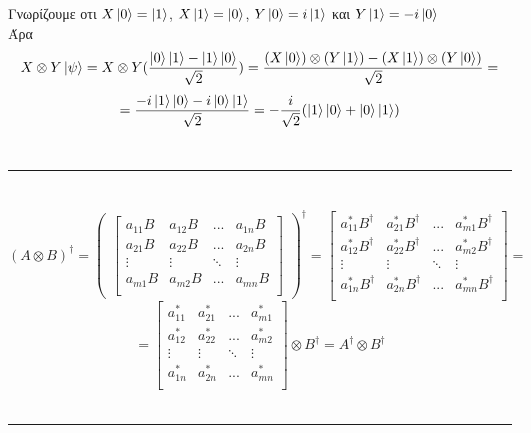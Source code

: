 \documentclass[12pt]{article}
\begin{document}
\section*{{}}
    Γνωρίζουμε οτι $X\ket{0}= \ket{1}$, $X\ket{1}= \ket{0}$, $Y\ket{0}= i\ket{1}$ και $Y\ket{1}= -i\ket{0}$\\
Άρα 
$$ X \otimes Y\ket{\psi} = X \otimes Y(\frac{\ket{0}\ket{1} - \ket{1}\ket{0}}{\sqrt{2}}) = \frac{(X\ket{0})\otimes(Y\ket{1}) - (X\ket{1})\otimes(Y\ket{0})}{\sqrt{2}}=$$ 
$$ = \frac{-i\ket{1}\ket{0} - i\ket{0}\ket{1}}{\sqrt{2}}=-\frac{i}{\sqrt{2}}(\ket{1}\ket{0} +\ket{0}\ket{1})$$\\
\rule{\textwidth}{.5pt}
\section*{{}}
$$(A\otimes B)^\dag = \begin{pmatrix}\begin{bmatrix}
    a_{11}B & a_{12}B & ... & a_{1n}B \\
    a_{21}B & a_{22}B & ... & a_{2n}B \\
    \vdots &\vdots & \ddots& \vdots \\
    a_{m1}B & a_{m2}B & ... & a_{mn}B \\
\end{bmatrix}\end{pmatrix} ^\dag = \begin{bmatrix}
    a_{11}^*B^\dag &  a_{21}^*B^\dag & ... &  a_{m1}^*B^\dag \\
    a_{12}^*B^\dag & a_{22}^*B^\dag & ... &  a_{m2}^*B^\dag \\
    \vdots &\vdots & \ddots& \vdots \\
    a_{1n}^*B^\dag &  a_{2n}^*B^\dag & ... &  a_{mn}^*B^\dag \\
\end{bmatrix}= $$
$$=\begin{bmatrix}
    a_{11}^* &  a_{21}^* & ... &  a_{m1}^* \\
    a_{12}^* & a_{22}^* & ... &  a_{m2}^* \\
    \vdots &\vdots & \ddots& \vdots \\
    a_{1n}^* &  a_{2n}^* & ... &  a_{mn}^* \\
\end{bmatrix}\otimes B^\dag = A^\dag \otimes B^\dag$$
\\\rule{\textwidth}{.5pt}
\end{document}
